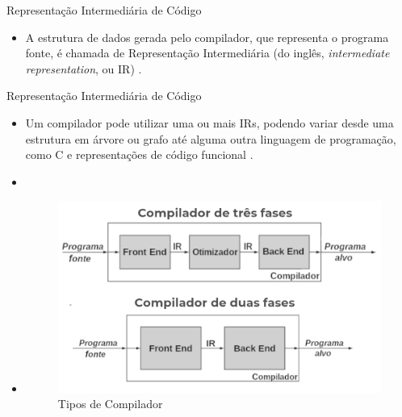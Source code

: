 \begin{frame}{Representação Intermediária de Código}
    \begin{itemize}
        \item A estrutura de dados gerada pelo compilador, que representa o programa fonte, é chamada de Representação Intermediária (do inglês, \textit{intermediate representation}, ou IR) \cite{cooper2014}.

    \end{itemize}
\end{frame}

\begin{frame}{Representação Intermediária de Código}
    \begin{itemize}
        \item Um compilador pode utilizar uma ou mais IRs, podendo variar desde uma estrutura em árvore ou grafo até alguma outra linguagem de programação, como C e representações de código funcional \cite{aho2008compilers}.

        \item []

        \item[] \begin{figure}
            \centering
            \includegraphics[width=.56\textwidth]{Figuras/compilador.png}
            \caption{Tipos de Compilador \cite{cooper2014}}
            \label{fig:comp}
        \end{figure} 
    \end{itemize}
\end{frame}